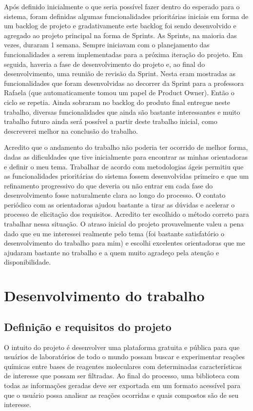 \documentclass{abnt}
\begin{document}
Após definido inicialmente o que seria possível fazer dentro do esperado para o
sistema, foram definidas algumas funcionalidades prioritárias iniciais em forma
de um backlog de projeto e gradativamente este backlog foi sendo desenvolvido e
agregado ao projeto principal na forma de Sprints. As Sprints, na maioria das vezes,
duraram 1 semana. Sempre iniciavam com o planejamento das funcionalidades a serem
implementadas para a próxima iteração do projeto. Em seguida, haveria a fase de
desenvolvimento do projeto e, ao final do desenvolvimento, uma reunião de revisão
da Sprint. Nesta eram mostradas as funcionalidades que foram desenvolvidas ao decorrer
da Sprint para a professora Rafaela (que automaticamente tomou um papel de Product
Owner). Então o ciclo se repetia. Ainda sobraram no backlog do produto final entregue
neste trabalho, diversas funcionalidades que ainda são bastante interessantes e muito
trabalho futuro ainda será possível a partir deste trabalho inicial, como descreverei
melhor na conclusão do trabalho.

Acredito que o andamento do trabalho não poderia ter ocorrido de melhor forma, dadas
as dificuldades que tive inicialmente para encontrar as minhas orientadoras e definir
o meu tema. Trabalhar de acordo com metodologias ágeis permitiu que as funcionalidades
prioritárias do sistema fossem desenvolvidas primeiro e que um refinamento progressivo
do que deveria ou não entrar em cada fase do desenvolvimento fosse naturalmente clara
ao longo do processo. O contato periódico com as orientadoras ajudou bastante a
tirar as dúvidas e acelerar o processo de elicitação dos requisitos. Acredito ter
escolhido o método correto para trabalhar nessa situação. O atraso inicial do projeto
provavelmente valeu a pena dado que eu me interessei realmente pelo tema (foi bastante
satisfatório o desenvolvimento do trabalho para mim) e escolhi excelentes orientadoras
que me ajudaram bastante no trabalho e a quem muito agradeço pela atenção e disponibilidade.

\chapter{Desenvolvimento do trabalho}

\section{Definição e requisitos do projeto}

O intuito do projeto é desenvolver uma plataforma gratuita e pública para que usuários
de laboratórios de todo o mundo possam buscar e experimentar reações químicas entre
bases de reagentes moleculares com determinadas características de interesse que
possam ser filtradas. Ao final do processo, uma biblioteca com todas as informações
geradas deve ser exportada em um formato acessível para que o usuário possa analisar
as reações ocorridas e quais compostos são de seu interesse.
\end{document}
